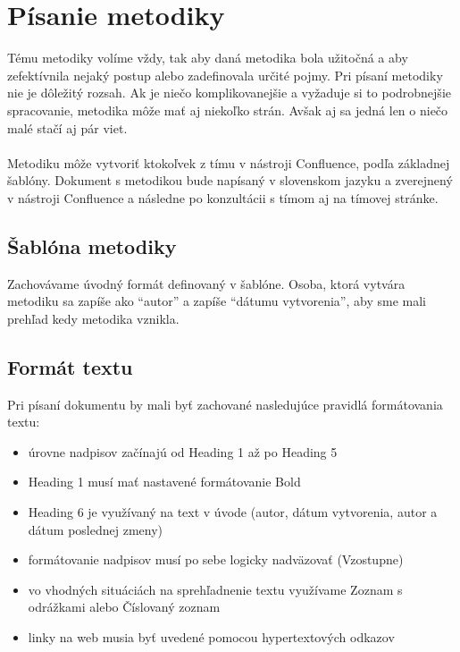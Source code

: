 \documentclass{article}
\begin{document}
    

    \section*{Písanie metodiky}

        \textnormal{%
        Tému metodiky volíme vždy, tak aby daná metodika bola užitočná a aby zefektívnila nejaký postup alebo zadefinovala určité pojmy. Pri písaní metodiky nie je dôležitý rozsah. Ak je niečo komplikovanejšie a vyžaduje si to podrobnejšie spracovanie, metodika môže mať aj niekoľko strán. Avšak aj sa jedná len o niečo malé stačí aj pár viet. \\\\
        Metodiku môže vytvoriť ktokoľvek z tímu v nástroji Confluence, podľa základnej šablóny. Dokument s metodikou bude napísaný v slovenskom jazyku a zverejnený v nástroji Confluence a následne po konzultácii s tímom aj na tímovej stránke.
        }

        \subsection*{Šablóna metodiky}

            \textnormal{Zachovávame úvodný formát definovaný v šablóne. Osoba, ktorá vytvára metodiku sa zapíše ako “autor” a zapíše “dátumu vytvorenia”, aby sme mali prehľad kedy metodika vznikla.}

        \subsection*{Formát textu}

            \textnormal{Pri písaní dokumentu by mali byť zachované nasledujúce pravidlá formátovania textu:}

            \begin{itemize}
                \item úrovne nadpisov začínajú od Heading 1 až po Heading 5
                \item Heading 1 musí mať nastavené formátovanie Bold
                \item Heading 6 je využívaný na text v úvode (autor, dátum vytvorenia, autor a dátum poslednej zmeny)
                \item formátovanie nadpisov musí po sebe logicky nadväzovať (Vzostupne)
                \item vo vhodných situáciách na sprehľadnenie textu využívame Zoznam s odrážkami alebo Číslovaný zoznam
                \item linky na web musia byť uvedené pomocou hypertextových odkazov
            \end{itemize}
\end{document}

